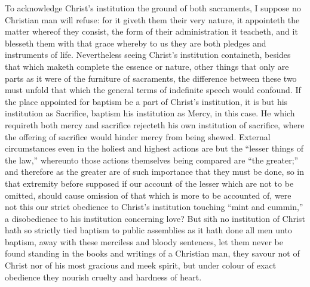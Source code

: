 To acknowledge Christ’s institution the ground of both sacraments, I suppose no Christian man will refuse: for it giveth them their very nature, it appointeth the matter whereof they consist, the form of their administration it teacheth, and it blesseth them with that grace whereby to us they are both pledges and instruments of life. Nevertheless seeing Christ’s institution containeth, besides that which maketh complete the essence or nature, other things that only are parts as it were of the furniture of sacraments, the difference between these two must unfold that which the general terms of indefinite speech would confound. If the place appointed for baptism be a part of Christ’s institution, it is but his institution as Sacrifice, baptism his institution as Mercy, in this case. He which requireth both mercy and sacrifice rejecteth his own institution of sacrifice, where the offering of sacrifice would hinder mercy from being shewed. External circumstances even in the holiest and highest actions are but the “lesser things of the law,” whereunto those actions themselves being compared are “the greater;” and therefore as the greater are of such importance that they must be done, so in that extremity before supposed if our account of the lesser which are not to be omitted, should cause omission of that which is more to be accounted of, were not this our strict obedience to Christ’s institution touching “mint and cummin,” a disobedience to his institution concerning love? But sith no institution of Christ hath so strictly tied baptism to public assemblies as it hath done all men unto baptism, away with these merciless and bloody sentences, let them never be found standing in the books and writings of a Christian man, they savour not of Christ nor of his most gracious and meek spirit, but under colour of exact obedience they nourish cruelty and hardness of heart.


